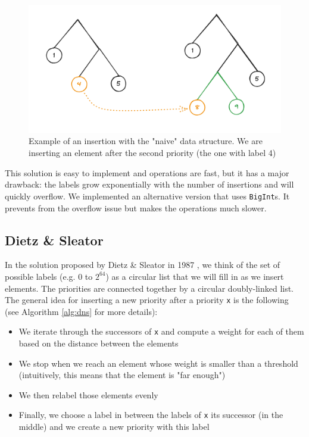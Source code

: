 \documentclass[12pt]{article}
\begin{document}
\begin{figure}[h!]
    \includegraphics[width=450px, keepaspectratio]{./naive-ex.png}
    \caption{Example of an insertion with the "naive" data structure. We are inserting an element after the second priority (the one with label 4)}
    \label{naive}
\end{figure}


This solution is easy to implement and operations are fast, but it has a major drawback: the labels grow exponentially with the number of insertions and will quickly overflow.
We implemented an alternative version that uses \texttt{BigInt}s. It prevents from the overflow issue but makes the operations much slower.

\subsection{Dietz \& Sleator}

In the solution proposed by Dietz \& Sleator in 1987 \cite{10.1145/28395.28434}, we think of the set of possible labels (e.g. $0$ to $2^{64}$) as a circular list that we will fill in as we insert elements.
The priorities are connected together by a circular doubly-linked list.
The general idea for inserting a new priority after a priority \texttt{x} is the following (see Algorithm \ref{alg:dns} for more details):
\begin{itemize}
    \item We iterate through the successors of \texttt{x} and compute a weight for each of them based on the distance between the elements
    \item We stop when we reach an element whose weight is smaller than a threshold (intuitively, this means that the element is "far enough")
    \item We then relabel those elements evenly
    \item Finally, we choose a label in between the labels of \texttt{x} its successor (in the middle) and we create a new priority with this label
\end{itemize}
\end{document}
